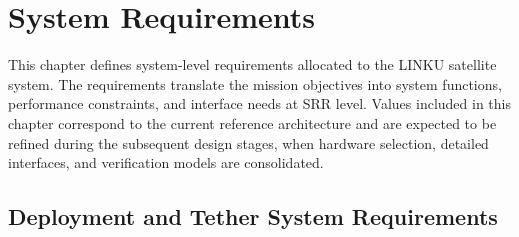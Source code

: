 \chapter{System Requirements}
\label{ch:system_requirements}
This chapter defines system-level requirements allocated to the LINKU satellite system. The requirements translate the mission objectives into system functions, performance constraints, and interface needs at SRR level. Values included in this chapter correspond to the current reference architecture and are expected to be refined during the subsequent design stages, when hardware selection, detailed interfaces, and verification models are consolidated.

\section{Deployment and Tether System Requirements}
\label{sec:req_deployment_tether}

